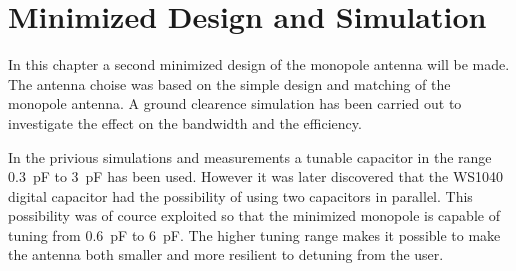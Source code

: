\chapter{Minimized Design and Simulation}
\label{cha_intro_5mm}
In this chapter a second minimized design of the monopole antenna will be made.
The antenna choise was based on the simple design and matching of the monopole antenna.
A ground clearence simulation has been carried out to investigate the effect on the bandwidth and the efficiency.

In the privious simulations and measurements a tunable capacitor in the range \SI{0.3}{pF} to \SI{3}{pF} has been used. However it was later discovered that the WS1040 digital capacitor had the possibility of using two capacitors in parallel. This possibility was of cource exploited so that the minimized monopole is capable of tuning from \SI{0.6}{pF} to \SI{6}{pF}. The higher tuning range makes it possible to make the antenna both smaller and more resilient to detuning from the user.
